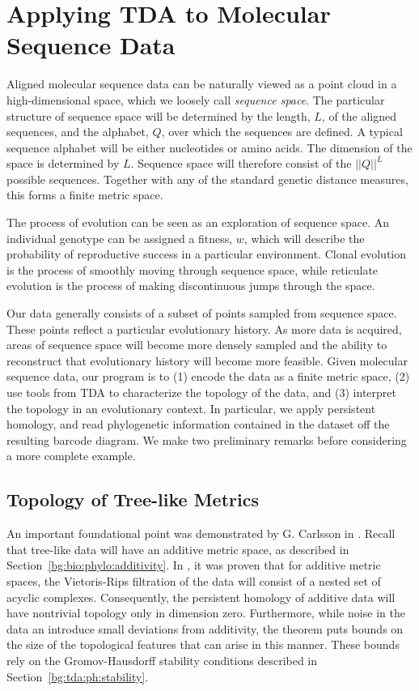 \section{Applying TDA to Molecular Sequence Data}
\label{bg:top4bio}

Aligned molecular sequence data can be naturally viewed as a point cloud in a high-dimensional space, which we loosely call \emph{sequence space}.
The particular structure of sequence space will be determined by the length, $L$, of the aligned sequences, and the alphabet, $Q$, over which the sequences are defined.
A typical sequence alphabet will be either nucleotides or amino acids.
The dimension of the space is determined by $L$.
Sequence space will therefore consist of the $||Q||^L$ possible sequences.
Together with any of the standard genetic distance measures, this forms a finite metric space.

The process of evolution can be seen as an exploration of sequence space.
An individual genotype can be assigned a fitness, $w$, which will describe the probability of reproductive success in a particular environment.
Clonal evolution is the process of smoothly moving through sequence space, while reticulate evolution is the process of making discontinuous jumps through the space.

Our data generally consists of a subset of points sampled from sequence space.
These points reflect a particular evolutionary history.
As more data is acquired, areas of sequence space will become more densely sampled and the ability to reconstruct that evolutionary history will become more feasible.
Given molecular sequence data, our program is to (1) encode the data as a finite metric space, (2) use tools from TDA to characterize the topology of the data, and (3) interpret the topology in an evolutionary context.
In particular, we apply persistent homology, and read phylogenetic information contained in the dataset off the resulting barcode diagram.
We make two preliminary remarks before considering a more complete example.

\subsection{Topology of Tree-like Metrics}
\label{bg:top4bio:treemetrics}

An important foundational point was demonstrated by G. Carlsson in \cite{Chan:2013}.
Recall that tree-like data will have an additive metric space, as described in Section~\ref{bg:bio:phylo:additivity}.
In \cite{Chan:2013}, it was proven that for additive metric spaces, the Vietoris-Rips filtration of the data will consist of a nested set of acyclic complexes.
Consequently, the persistent homology of additive data will have nontrivial topology only in dimension zero.
Furthermore, while noise in the data an introduce small deviations from additivity, the theorem puts bounds on the size of the topological features that can arise in this manner.
These bounds rely on the Gromov-Hausdorff stability conditions described in Section~\ref{bg:tda:ph:stability}.


